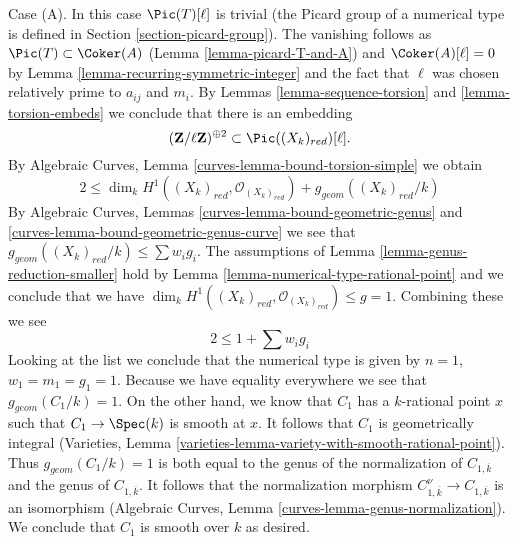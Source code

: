 \medskip\noindent
Case (A). In this case $\Pic(T)[\ell]$ is trivial (the Picard group
of a numerical type is defined in Section \ref{section-picard-group}).
The vanishing follows as $\Pic(T) \subset \Coker(A)$
(Lemma \ref{lemma-picard-T-and-A}) and $\Coker(A)[\ell] = 0$ by
Lemma \ref{lemma-recurring-symmetric-integer} and the
fact that $\ell$ was chosen relatively prime to $a_{ij}$ and $m_i$.
By Lemmas \ref{lemma-sequence-torsion} and \ref{lemma-torsion-embeds}
we conclude that there is an embedding
$$
(\mathbf{Z}/\ell \mathbf{Z})^{\oplus 2} \subset \Pic((X_k)_{red})[\ell].
$$
By Algebraic Curves, Lemma \ref{curves-lemma-bound-torsion-simple} we obtain
$$
2 \leq \dim_k H^1((X_k)_{red}, \mathcal{O}_{(X_k)_{red}}) +
g_{geom}((X_k)_{red}/k)
$$
By Algebraic Curves, Lemmas \ref{curves-lemma-bound-geometric-genus} and
\ref{curves-lemma-bound-geometric-genus-curve}
we see that $g_{geom}((X_k)_{red}/k) \leq \sum w_ig_i$.
The assumptions of Lemma \ref{lemma-genus-reduction-smaller}
hold by Lemma \ref{lemma-numerical-type-rational-point} and we
conclude that we have
$\dim_k H^1((X_k)_{red}, \mathcal{O}_{(X_k)_{red}}) \leq g = 1$.
Combining these we see
$$
2 \leq 1 + \sum w_i g_i
$$
Looking at the list we conclude that the numerical type is given by
$n = 1$, $w_1 = m_1 = g_1 = 1$. Because we have equality everywhere
we see that $g_{geom}(C_1/k) = 1$. On the other hand, we know
that $C_1$ has a $k$-rational point $x$ such that $C_1 \to \Spec(k)$
is smooth at $x$. It follows that $C_1$ is geometrically integral
(Varieties, Lemma \ref{varieties-lemma-variety-with-smooth-rational-point}).
Thus $g_{geom}(C_1/k) = 1$ is both equal to the genus of the normalization
of $C_{1, \overline{k}}$ and the genus of $C_{1, \overline{k}}$.
It follows that the normalization morphism
$C_{1, \overline{k}}^\nu \to C_{1, \overline{k}}$
is an isomorphism
(Algebraic Curves, Lemma \ref{curves-lemma-genus-normalization}).
We conclude that $C_1$ is smooth over $k$ as desired.

